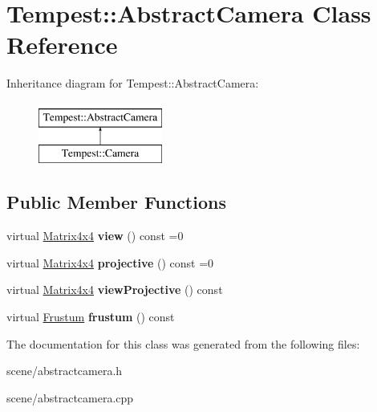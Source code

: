 \hypertarget{class_tempest_1_1_abstract_camera}{\section{Tempest\+:\+:Abstract\+Camera Class Reference}
\label{class_tempest_1_1_abstract_camera}
}
Inheritance diagram for Tempest\+:\+:Abstract\+Camera\+:\begin{figure}[H]
\begin{center}
\leavevmode
\includegraphics[height=2.000000cm]{class_tempest_1_1_abstract_camera}
\end{center}
\end{figure}
\subsection*{Public Member Functions}
\begin{DoxyCompactItemize}
\item 
\hypertarget{class_tempest_1_1_abstract_camera_a30262652c98af23f2f79eaccd9f345ce}{virtual \hyperlink{class_tempest_1_1_matrix4x4}{Matrix4x4} {\bfseries view} () const =0}\label{class_tempest_1_1_abstract_camera_a30262652c98af23f2f79eaccd9f345ce}

\item 
\hypertarget{class_tempest_1_1_abstract_camera_a15a58e6b7f662a3e8328c88c453704ab}{virtual \hyperlink{class_tempest_1_1_matrix4x4}{Matrix4x4} {\bfseries projective} () const =0}\label{class_tempest_1_1_abstract_camera_a15a58e6b7f662a3e8328c88c453704ab}

\item 
\hypertarget{class_tempest_1_1_abstract_camera_afab002cfe7802f95551c08cceb1d65d4}{virtual \hyperlink{class_tempest_1_1_matrix4x4}{Matrix4x4} {\bfseries view\+Projective} () const }\label{class_tempest_1_1_abstract_camera_afab002cfe7802f95551c08cceb1d65d4}

\item 
\hypertarget{class_tempest_1_1_abstract_camera_a0a6ce17423e9585a0974aff3706f8cbb}{virtual \hyperlink{class_tempest_1_1_frustum}{Frustum} {\bfseries frustum} () const }\label{class_tempest_1_1_abstract_camera_a0a6ce17423e9585a0974aff3706f8cbb}

\end{DoxyCompactItemize}


The documentation for this class was generated from the following files\+:\begin{DoxyCompactItemize}
\item 
scene/abstractcamera.\+h\item 
scene/abstractcamera.\+cpp\end{DoxyCompactItemize}
